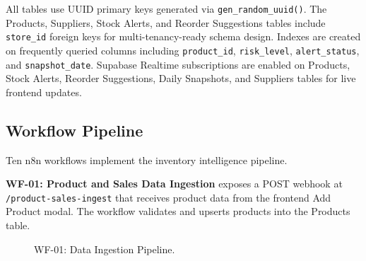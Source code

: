 \documentclass[journal]{IEEEtran}
\begin{document}
All tables use UUID primary keys generated via \texttt{gen\_random\_uuid()}. The Products, Suppliers, Stock Alerts, and Reorder Suggestions tables include \texttt{store\_id} foreign keys for multi-tenancy-ready schema design. Indexes are created on frequently queried columns including \texttt{product\_id}, \texttt{risk\_level}, \texttt{alert\_status}, and \texttt{snapshot\_date}. Supabase Realtime subscriptions are enabled on Products, Stock Alerts, Reorder Suggestions, Daily Snapshots, and Suppliers tables for live frontend updates.

\subsection{Workflow Pipeline}

Ten n8n workflows implement the inventory intelligence pipeline.

\textbf{WF-01: Product and Sales Data Ingestion} exposes a POST webhook at \texttt{/product-sales-ingest} that receives product data from the frontend Add Product modal. The workflow validates and upserts products into the Products table.

\begin{figure}[H]
\centering
{}
\caption{WF-01: Data Ingestion Pipeline.}
\label{fig:wf01}
\end{figure}
\end{document}

